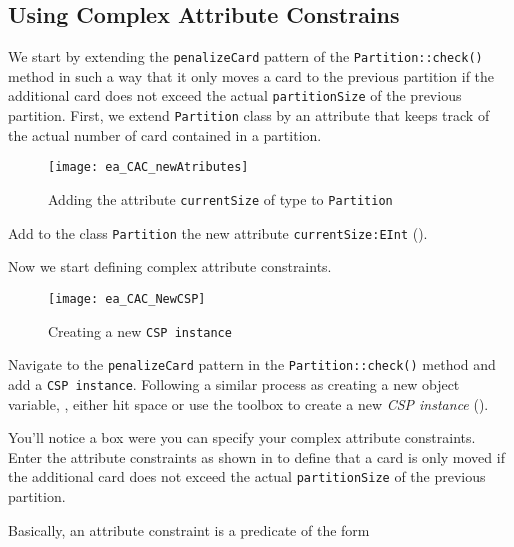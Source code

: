 \subsection{Using Complex Attribute Constrains}     
We start by extending the \texttt{penalizeCard} pattern of the \texttt{Partition::check()} method in such a way that it only moves a card to the previous partition if the additional card does not exceed the actual \texttt{partitionSize} of the previous partition.
First, we extend \texttt{Partition} class by an attribute that keeps track of the actual number of card contained in a partition.
\begin{figure}[htbp]
\begin{center}
  \texttt{[image: ea\_CAC\_newAtributes]}
  \caption{Adding the attribute \texttt{currentSize} of type  to \texttt{Partition}}  
  \label{ea_CAC_newAtributes}
\end{center}
\end{figure}
%
\begin{stepbystep}    
\item Add to the class \texttt{Partition} the new attribute \texttt{currentSize:EInt} ().
\end{stepbystep} 
%
Now we start defining complex attribute constraints.
\begin{figure}[htbp]
\begin{center}
  \texttt{[image: ea\_CAC\_NewCSP]}
  \caption{Creating a new \texttt{CSP instance}}  
  \label{ea:CAC_NewCSP}
\end{center}
\end{figure}
\begin{stepbystep}
%
\item Navigate to the \texttt{penalizeCard} pattern in the \texttt{Partition::check()} method and add a \texttt{CSP instance}.
Following a similar process as creating a new object variable, \idest, either hit space or use the toolbox to create a new \emph{CSP instance} ().
%
\item You’ll notice a box were you can specify your complex attribute constraints. Enter the attribute constraints as shown in  to define that a card is only moved if the additional card does not exceed the actual \texttt{partitionSize} of the previous partition.
%
\end{stepbystep}

Basically, an attribute constraint is a predicate of the form

